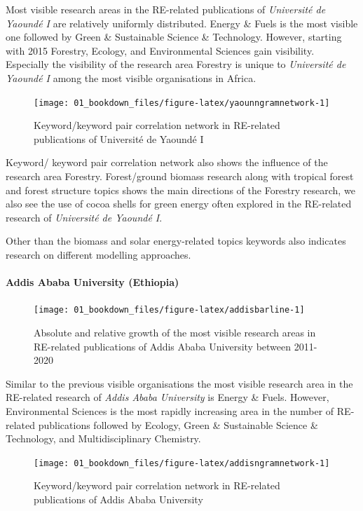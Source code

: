 \documentclass[
]{book}
\begin{document}
Most visible research areas in the RE-related publications of \emph{Université de Yaoundé I} are relatively uniformly distributed. Energy \& Fuels is the most visible one followed by Green \& Sustainable Science \& Technology. However, starting with 2015 Forestry, Ecology, and Environmental Sciences gain visibility. Especially the visibility of the research area Forestry is unique to \emph{Université de Yaoundé I} among the most visible organisations in Africa.

\begin{figure}
\texttt{[image: 01\_bookdown\_files/figure-latex/yaounngramnetwork-1]} \caption{Keyword/keyword pair correlation network in RE-related publications of Université de Yaoundé I}\label{fig:yaounngramnetwork}
\end{figure}

Keyword/ keyword pair correlation network also shows the influence of the research area Forestry. Forest/ground biomass research along with tropical forest and forest structure topics shows the main directions of the Forestry research, we also see the use of cocoa shells for green energy often explored in the RE-related research of \emph{Université de Yaoundé I}.

Other than the biomass and solar energy-related topics keywords also indicates research on different modelling approaches.

\hypertarget{addis-ababa-university-ethiopia}{%
\paragraph{Addis Ababa University (Ethiopia)}\label{addis-ababa-university-ethiopia}}

\begin{figure}
\texttt{[image: 01\_bookdown\_files/figure-latex/addisbarline-1]} \caption{Absolute and relative growth of the most visible research areas in RE-related publications of Addis Ababa University between 2011-2020}\label{fig:addisbarline}
\end{figure}

Similar to the previous visible organisations the most visible research area in the RE-related research of \emph{Addis Ababa University} is Energy \& Fuels. However, Environmental Sciences is the most rapidly increasing area in the number of RE-related publications followed by Ecology, Green \& Sustainable Science \& Technology, and Multidisciplinary Chemistry.

\begin{figure}
\texttt{[image: 01\_bookdown\_files/figure-latex/addisngramnetwork-1]} \caption{Keyword/keyword pair correlation network in RE-related publications of Addis Ababa University}\label{fig:addisngramnetwork}
\end{figure}
\end{document}

